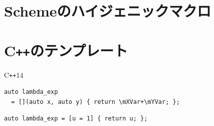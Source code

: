 \documentclass[a5paper,twoside,fleqn,draft]{jsbook}
\def\varColor{NavyBlue}
\newcommand{\programminglanguage}[1]{\textsf{#1}}
\newcommand{\cxx}{\programminglanguage{C}\texttt{++}}
\newcommand{\cxxfourteen}{\cxx\programminglanguage{14}}
\newcommand{\scheme}{\programminglanguage{Scheme}}
\newcommand{\mVar}[1]{\textcolor{\varColor}{#1}}
\newcommand{\mXVar}{\mVar{x}}
\newcommand{\mYVar}{\mVar{y}}
\begin{document}
\section{\scheme のハイジェニックマクロ}

\section{\cxx のテンプレート}





\cxxfourteen
\begin{verbatim}
auto lambda_exp
  = [](auto x, auto y) { return \mXVar+\mYVar; };
\end{verbatim}

\begin{verbatim}
auto lambda_exp = [u = 1] { return u; };
\end{verbatim}


\end{document}
